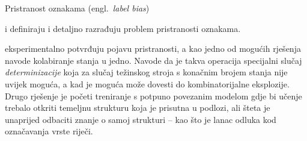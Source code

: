 Pristranost oznakama (engl.~\emph{label bias})

\citet*{lafferty2001conditional} i \citet*{leon1991approche} definiraju i
detaljno razrađuju problem pristranosti oznakama.

\citet*{lafferty2001conditional} eksperimentalno potvrđuju pojavu pristranosti,
a kao jedno od mogućih rješenja navode kolabiranje stanja u jedno. Navode da je
takva operacija specijalni slučaj \emph{determinizacije} koja za slučaj
težinskog stroja s konačnim brojem stanja nije uvijek moguća, a kad je moguća
može dovesti do kombinatorijalne eksplozije. Drugo rješenje je početi treniranje
s potpuno povezanim modelom gdje bi učenje trebalo otkriti temeljnu strukturu
koja je prisutna u podlozi, ali šteta je unaprijed odbaciti znanje o samoj
strukturi -- kao što je lanac odluka kod označavanja vrste riječi.
